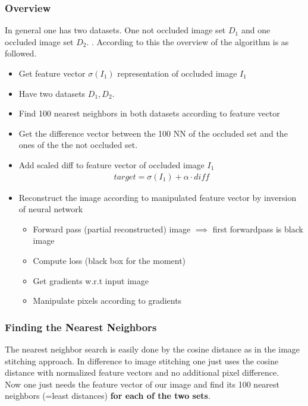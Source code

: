\documentclass[
     11pt,         %
     a4paper,      %
     oneside,
     ]{article}
\begin{document}
\subsubsection{Overview}
In general one has two datasets. One not occluded image set $D_1$ and one occluded image set $D_2$.
. According to this the overview of the algorithm is as followed.
\begin{itemize}
	\item Get feature vector $\sigma (I_1)$ representation of occluded image $I_1$
	\item Have two datasets $D_1, D_2$.
    \item Find 100 nearest neighbors in both datasets according to feature vector
    \item Get the difference vector between the 100 NN of the occluded set and the ones of the the not occluded set.\\
    \item Add scaled diff to feature vector of occluded image $I_1$
    \begin{align*}
    	target = \sigma (I_1) + \alpha \cdot diff
    \end{align*}
    \item Reconstruct the image according to manipulated feature vector by inversion of neural network
    \begin{itemize}
        \item Forward pass (partial reconstructed) image
        $\implies$ first forwardpass is black image
        \item Compute loss (black box for the moment)
        \item Get gradients w.r.t input image
        \item Manipulate pixels according to gradients
    \end{itemize}
\end{itemize}

\subsubsection{Finding the Nearest Neighbors}
The nearest neighbor search is easily done by the cosine distance as in the image stitching approach.
In difference to image stitching one just uses the cosine distance with normalized feature vectors and no additional pixel difference.\\
Now one just needs the feature vector of our image and find its 100 nearest neighbors (=least distances) \textbf{for each of the two sets}.
\end{document}
